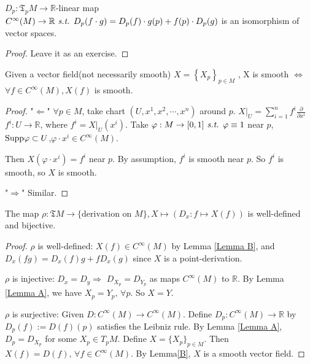 \begin{lemma}\label{Lemma A}
    $D_p:\mathfrak{T}_p{M} \rightarrow \mathbb{R}$-linear map $C^\infty(M)\rightarrow\mathbb{R} \textit{ s.t. } D_p(f\cdot g)=D_p(f)\cdot g(p)+f(p)\cdot D_p(g)$ is an isomorphism of vector spaces.
\end{lemma}
\begin{proof}

     Leave it as an exercise.
\end{proof}
\begin{lemma}\label{Lemma B}
    Given a vector field(not necessarily smooth) $X=\left\{X_p\right\}_{p\in M}$ , X is smooth $\Leftrightarrow$ $\forall f \in C^\infty(M),X(f)$ is smooth.
\end{lemma}
\begin{proof}
    "$ \Leftarrow $" $\forall p\in M$, take chart $(U,x^1,x^2,\cdots,x^n)$ around $p$. $X|_U=\sum_{i=1}^{n}{f^i\frac{\partial}{\partial x^i}}$  $f^i:U\rightarrow \mathbb{R}$, where $f^i=X|_U(x^i)$.
    Take $\varphi:M\rightarrow [0,1] \textit{ s.t. } \varphi \equiv 1 $ near $p$, $\mathrm{Supp} \varphi\subset U$,$\varphi \cdot x^i\in C^\infty(M)$.
    
    Then $X(\varphi \cdot x^i)=f^i$ near $p$. By assumption, $f^i$ is smooth near $p$. So $f^i$ is smooth, so $X$ is smooth.
    
     "$ \Rightarrow $" Similar.
\end{proof}
\begin{theorem}
    The map $\rho:\mathfrak{T}M\rightarrow \{\text{derivation on }M\},X\mapsto (D_x:f\mapsto X(f))$ is well-defined and bijective.
\end{theorem}
\begin{proof}
     $ \rho $ is well-defined: $ X(f)\in C^\infty(M) $ by Lemma \ref{Lemma B}, and  $ D_x(fg)=D_x(f)g+fD_x(g) $ since  $ X $ is a point-derivation.
     
      $ \rho $ is injective: $ D_x=D_y\Rightarrow $ $ D_{X_p}=D_{Y_p} $ as maps  $ C^\infty(M) $ to  $ \mathbb{R} $. By Lemma \ref{Lemma A}, we have  $ X_p=Y_p,\,\forall p $. So  $ X=Y $.  
      
       $ \rho $ is surjective: Given  $ D:C^\infty(M)\rightarrow C^\infty(M) $. Define  $ D_p:C^\infty(M)\rightarrow \mathbb{R} $ by  $ D_p(f):=D(f)(p) $ satisfies the Leibniz rule. By Lemma \ref{Lemma A},  $ D_p=D_{X_p} $ for some  $ X_p\in T_pM $. Define  $ X=\{X_p\}_{p\in M} $. Then  $ X(f)=D(f) ,\,\forall f\in C^\infty(M)$. By Lemma\ref{B},  $ X $ is a smooth vector field.    
\end{proof}
